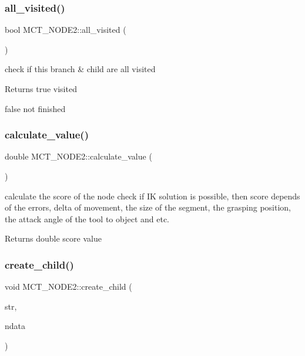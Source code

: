 \subsubsection{\texorpdfstring{all\+\_\+visited()}{all\_visited()}}
{\footnotesize\ttfamily bool M\+C\+T\+\_\+\+N\+O\+D\+E2\+::all\+\_\+visited (\begin{DoxyParamCaption}{ }\end{DoxyParamCaption})\hspace{0.3cm}{\ttfamily [private]}}



check if this branch \& child are all visited 

\begin{DoxyReturn}{Returns}
true visited 

false not finished 
\end{DoxyReturn}
\mbox{\label{classMCT__NODE2_a54908b7091bfc9ef49c06b2310d94408}} 
\subsubsection{\texorpdfstring{calculate\+\_\+value()}{calculate\_value()}}
{\footnotesize\ttfamily double M\+C\+T\+\_\+\+N\+O\+D\+E2\+::calculate\+\_\+value (\begin{DoxyParamCaption}{ }\end{DoxyParamCaption})\hspace{0.3cm}{\ttfamily [private]}}



calculate the score of the node check if IK solution is possible, then score depends of the errors, delta of movement, the size of the segment, the grasping position, the attack angle of the tool to object and etc. 

\begin{DoxyReturn}{Returns}
double score value 
\end{DoxyReturn}
\mbox{\label{classMCT__NODE2_ab7b3824130219c1afdfd8d8358e52d76}} 
\subsubsection{\texorpdfstring{create\+\_\+child()}{create\_child()}}
{\footnotesize\ttfamily void M\+C\+T\+\_\+\+N\+O\+D\+E2\+::create\+\_\+child (\begin{DoxyParamCaption}\item[{string}]{str,  }\item[{\hyperlink{structNODE__DATA}{N\+O\+D\+E\+\_\+\+D\+A\+TA}}]{ndata }\end{DoxyParamCaption})}



